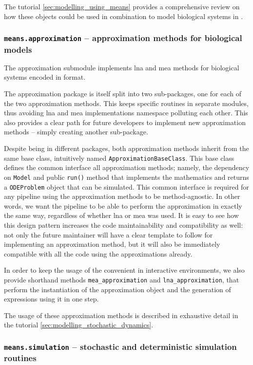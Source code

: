 The tutorial \autoref{sec:modelling_using_means} provides a comprehensive review on how these objects could be used in combination to model biological systems in \means{}.

\subsubsection{{\tt means.approximation} -- approximation methods for biological models}

The approximation submodule implements \gls{lna} and \gls{mea} methods for biological systems encoded in \means{} format.

The approximation package is itself split into two sub-packages, one for each of the two approximation methods.
This keeps specific routines in separate modules, thus avoiding \gls{lna} and \gls{mea} implementations namespace polluting each other.
This also provides a clear path for future developers to implement new approximation methods -- simply creating another sub-package.

Despite being in different packages, both approximation methods inherit from the same base class, intuitively named \verb"ApproximationBaseClass".
This base class defines the common interface all approximation methods; namely, the dependency on \verb"Model" and public \verb"run()" method that implements the mathematics and returns a \verb"ODEProblem" object that can be simulated.
This common interface is required for any pipeline using the approximation methods to be method-agnostic.
In other words, we want the pipeline to be able to perform the approximation in exactly the same way, regardless of whether \gls{lna} or \gls{mea} was used. 
It is easy to see how this design pattern increases the code maintainability and compatibility as well: not only the future maintainer will have a clear template to follow for implementing an approximation method, but it will also be immediately compatible with all the code using the approximations already.

In order to keep the usage of the \means{} convenient in interactive environments, we also provide shorthand methods \verb"mea_approximation" and \verb"lna_approximation", that perform the instantiation of the approximation object and the generation of expressions using it in one step.

The usage of these approximation methods is described in exhaustive detail in the tutorial \autoref{sec:modelling_stochastic_dynamics}.

\subsubsection{{\tt means.simulation} -- stochastic and deterministic simulation routines}

